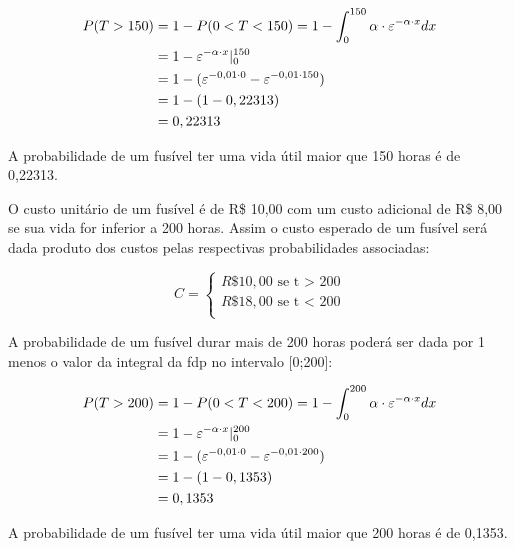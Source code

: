 \documentclass[
]{book}
\begin{document}
\hfill\break

\begin{align*}
P( T > 150) & = 1 - P(0<T<150) = 1- \int_{0}^{150}  \alpha \cdot \varepsilon ^{- \alpha \cdot x} dx \\
            & = 1 - \varepsilon^{-\alpha \cdot x} \rvert_{0}^{150} \\
            & = 1 - (\varepsilon^{- 0,01 \cdot 0} - \varepsilon^{-0,01 \cdot 150}) \\
            & = 1 - (1  - 0,22313) \\
            & = 0,22313 \newline
\end{align*}

\hfill\break

A probabilidade de um fusível ter uma vida útil maior que 150 horas é de 0,22313.

\hfill\break

O custo unitário de um fusível é de R\$ 10,00 com um custo adicional de R\$ 8,00 se sua vida for inferior a 200 horas. Assim o custo esperado de um fusível será dada produto dos custos pelas respectivas probabilidades associadas:

\[
C=
\begin{cases}
R\$ 10,00 \text{ se t > 200}\\
R\$ 18,00 \text{ se t < 200}\\
\end{cases}
\]

\hfill\break

A probabilidade de um fusível durar mais de 200 horas poderá ser dada por 1 menos o valor da integral da fdp no intervalo {[}0;200{]}:

\hfill\break

\begin{align*}
P( T > 200) & = 1 - P(0<T<200) = 1- \int_{0}^{200}  \alpha \cdot \varepsilon ^{- \alpha \cdot x} dx \\
            & = 1 - \varepsilon^{-\alpha \cdot x} \rvert_{0}^{200} \\
            & = 1 - (\varepsilon^{- 0,01 \cdot 0} - \varepsilon^{-0,01 \cdot 200}) \\
            & = 1 - (1  - 0,1353) \\
            & = 0,1353 \newline
\end{align*}

\hfill\break

A probabilidade de um fusível ter uma vida útil maior que 200 horas é de 0,1353.
\end{document}
